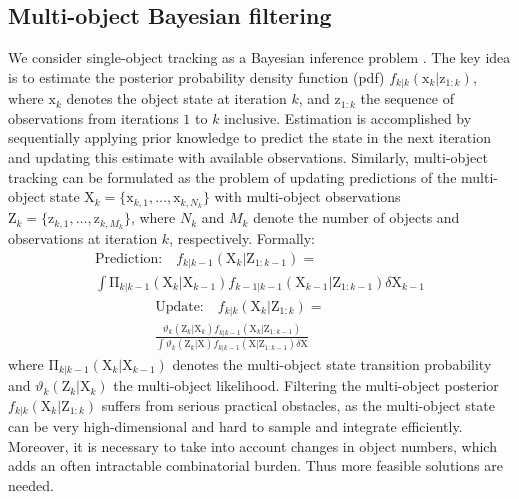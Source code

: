 \documentclass[noinfo,nocrop,final]{bioinfo}
\begin{document}
\subsection{Multi-object Bayesian filtering} \label{ssec:multi-obj-bay-filt}
We consider single-object tracking as a Bayesian inference problem \citep{bar2004estimation, sarkka2013bayesian}. The key idea is to estimate the posterior probability density function (pdf) $f_{k|k}(\mathrm{x}_k | \mathrm{z}_{1:k})$, where $\mathrm{x}_k$ denotes the object state at iteration $k$, and $\mathrm{z}_{1:k}$ the sequence of observations from iterations $1$ to $k$ inclusive. Estimation is accomplished by sequentially applying prior knowledge to predict the state in the next iteration and updating this estimate with available observations. Similarly, multi-object tracking can be formulated as the problem of updating predictions of the multi-object state $\mathrm{X}_k = \{\mathrm{x}_{k,1},\ldots,\mathrm{x}_{k,N_k}\}$ with multi-object observations $\mathrm{Z}_k = \{\mathrm{z}_{k,1},\ldots,\mathrm{z}_{k,M_k}\}$, where $N_k$ and $M_k$ denote the number of objects and observations at iteration $k$, respectively. Formally:
\vspace{-0.5\baselineskip}
\begin{multline}
\label{eq:prediction}
\textrm{Prediction:}\quad f_{k|k-1}(\mathrm{X}_k | \mathrm{Z}_{1:k-1}) = \\ 
\int\!\mathrm{\Pi}_{k|k-1}(\mathrm{X}_k | \mathrm{X}_{k-1}) f_{k-1|k-1}(\mathrm{X}_{k-1}|\mathrm{Z}_{1:k-1}) \delta\mathrm{X}_{k-1}
\end{multline}
\vspace{-2\baselineskip}
\begin{multline}
\label{eq:update}
\textrm{Update:}\quad f_{k|k}(\mathrm{X}_k|\mathrm{Z}_{1:k}) = \\
\frac{\vartheta_k(\mathrm{Z}_k|\mathrm{X}_k) f_{k|k-1}(\mathrm{X}_k|\mathrm{Z}_{1:k-1})}{\int\!\vartheta_k(\mathrm{Z}_k|\mathrm{X})f_{k|k-1}(\mathrm{X}|\mathrm{Z}_{1:k-1}) \delta\mathrm{X}}\qquad\qquad
\end{multline}
where $\mathrm{\Pi}_{k|k-1}(\mathrm{X}_k | \mathrm{X}_{k-1})$ denotes the multi-object state transition probability and $\vartheta_k(\mathrm{Z}_k|\mathrm{X}_k)$ the multi-object likelihood. Filtering the multi-object posterior $f_{k|k}(\mathrm{X}_k | \mathrm{Z}_{1:k})$ suffers from serious practical obstacles, as the multi-object state can be very high-dimensional and hard to sample and integrate efficiently. Moreover, it is necessary to take into account changes in object numbers, which adds an often intractable combinatorial burden. Thus more feasible solutions are needed.
\end{document}

